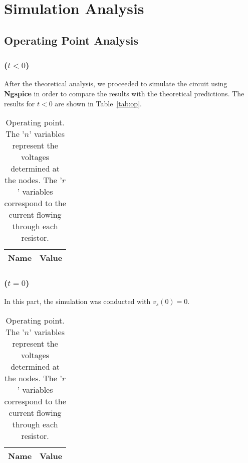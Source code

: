 \newpage

\section{Simulation Analysis}
\label{sec:simulation}

\subsection{Operating Point Analysis}
\label{sec:op_point}

\subsubsection{($t < 0$)}

After the theoretical analysis, we proceeded to simulate the circuit using {\bf Ngspice} in order to compare the results with the theoretical predictions. The results for $t < 0$ are shown in Table~\ref{tab:op}.

\begin{table}[H]
	\centering
	\begin{tabular}{|l|c|}
		\hline    
		    {\bf Name} & {\bf Value} \\
                    \hline
                    \hline
		
	\end{tabular}
	\caption{Operating point. The '$n$' variables represent the voltages determined at the nodes. The '$r$' variables correspond to the current flowing through each resistor.}
	\label{tab:op1}
\end{table}

\subsubsection{($t = 0$)}

In this part, the simulation was conducted with $v_s(0) = 0$. 

\begin{table}[H]
	\centering
	\begin{tabular}{|l|c|}
		\hline    
		    {\bf Name} & {\bf Value} \\
                    \hline
                    \hline
		
	\end{tabular}
	\caption{Operating point. The '$n$' variables represent the voltages determined at the nodes. The '$r$' variables correspond to the current flowing through each resistor.}
	\label{tab:op2}
\end{table}

